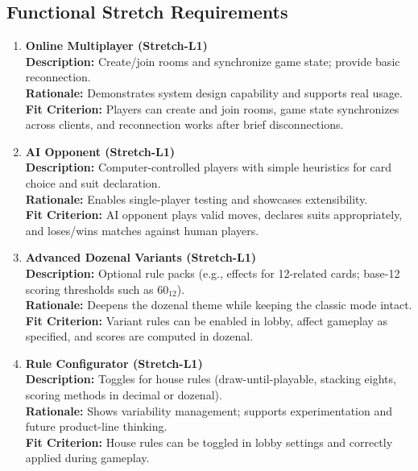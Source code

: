 \documentclass[12pt]{article}
\begin{document}
\subsection{Functional Stretch Requirements}
\begin{enumerate}

  \item \textbf{Online Multiplayer (Stretch-L1)}\\
  \textbf{Description:} Create/join rooms and synchronize game state; provide basic reconnection.\\
  \textbf{Rationale:} Demonstrates system design capability and supports real usage.\\
  \textbf{Fit Criterion:} Players can create and join rooms, game state synchronizes across clients, and reconnection works after brief disconnections.
  
  \item \textbf{AI Opponent (Stretch-L1)}\\
  \textbf{Description:} Computer-controlled players with simple heuristics for card choice and suit declaration.\\
  \textbf{Rationale:} Enables single-player testing and showcases extensibility.\\
  \textbf{Fit Criterion:} AI opponent plays valid moves, declares suits appropriately, and loses/wins matches against human players.
  
  \item \textbf{Advanced Dozenal Variants (Stretch-L1)}\\
  \textbf{Description:} Optional rule packs (e.g., effects for 12-related cards; base-12 scoring thresholds such as \(60_{12}\)).\\
  \textbf{Rationale:} Deepens the dozenal theme while keeping the classic mode intact.\\
  \textbf{Fit Criterion:} Variant rules can be enabled in lobby, affect gameplay as specified, and scores are computed in dozenal.
  
  \item \textbf{Rule Configurator (Stretch-L1)}\\
  \textbf{Description:} Toggles for house rules (draw-until-playable, stacking eights, scoring methods in decimal or dozenal).\\
  \textbf{Rationale:} Shows variability management; supports experimentation and future product-line thinking.\\
  \textbf{Fit Criterion:} House rules can be toggled in lobby settings and correctly applied during gameplay.
  

\end{enumerate}
\end{document}

